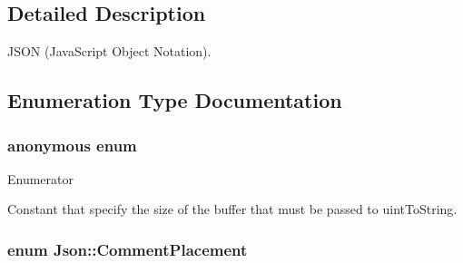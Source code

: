 \subsection{Detailed Description}
J\-S\-O\-N (Java\-Script Object Notation). 

\subsection{Enumeration Type Documentation}
\hypertarget{namespace_json_a0c5f614b019f20b4598dcaec09d9e820}{\subsubsection[{anonymous enum}]{\setlength{\rightskip}{0pt plus 5cm}anonymous enum}}\label{namespace_json_a0c5f614b019f20b4598dcaec09d9e820}
\begin{Desc}
\item[Enumerator]\par
\begin{description}
\item[{\em 
\hypertarget{namespace_json_a0c5f614b019f20b4598dcaec09d9e820ae4f2008c7919f20d81286121d1374424}{uint\-To\-String\-Buffer\-Size}\label{namespace_json_a0c5f614b019f20b4598dcaec09d9e820ae4f2008c7919f20d81286121d1374424}
}]Constant that specify the size of the buffer that must be passed to uint\-To\-String. \end{description}
\end{Desc}
\hypertarget{namespace_json_a4fc417c23905b2ae9e2c47d197a45351}{
\subsubsection[{Comment\-Placement}]{\setlength{\rightskip}{0pt plus 5cm}enum {\bf Json\-::\-Comment\-Placement}}}\label{namespace_json_a4fc417c23905b2ae9e2c47d197a45351}
